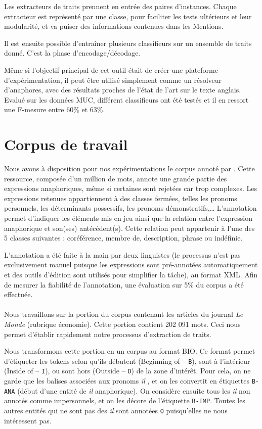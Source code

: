 \documentclass[a4paper,12pt]{article}
\begin{document}
Les extracteurs de traits prennent en entrée des paires d'instances. Chaque extracteur est représenté par une classe, pour faciliter les tests ultérieurs et leur modularité, et va puiser des informations contenues dans les Mentions.

Il est ensuite possible d'entraîner plusieurs classifieurs sur un ensemble de traits donné. C'est la phase d'encodage/décodage.

Même si l'objectif principal de cet outil était de créer une plateforme d'expérimentation, il peut être utilisé simplement comme un résolveur d'anaphores, avec des résultats proches de l'état de l'art sur le texte anglais. Evalué sur les données MUC, différent classifieurs ont été testés et il en ressort une F-mesure entre 60\% et 63\%.

\section{Corpus de travail}
\label{corpus}

Nous avons à disposition pour nos expérimentations le corpus annoté par \citet{tutin-hal-00373327}.
Cette ressource, composée d'un million de mots, annote une grande partie des expressions anaphoriques, même si certaines sont rejetées car trop complexes. Les expressions retenues appartiennent à des classes fermées, telles les pronoms personnels, les déterminants possessifs, les pronoms démonstratifs,\ldots
L'annotation permet d'indiquer les éléments mis en jeu ainsi que la relation entre l'expression anaphorique et son(ses) antécédent(s). Cette relation peut appartenir à l'une des 5 classes suivantes : coréférence, membre de, description, phrase ou indéfinie.

L'annotation a été faite à la main par deux linguistes (le processus n'est pas exclusivement manuel puisque les expressions sont pré-annotées automatiquement et des outils d'édition sont utilisés pour simplifier la tâche), au format XML. Afin de mesurer la fiabilité de l'annotation, une évaluation sur 5\% du corpus a été effectuée.

\paragraph{}
Nous travaillons sur la portion du corpus contenant les articles du journal \emph{Le Monde} (rubrique économie). Cette portion contient 202 091 mots. Ceci nous permet d'établir rapidement notre processus d'extraction de traits.


Nous transformons cette portion en un corpus au format BIO. Ce format permet d'étiqueter les tokens selon qu'ils débutent (Beginning of -- \verb!B!), sont à l'intérieur (Inside of -- \verb!I!), ou sont hors (Outside -- \verb!O!) de la zone d'intérêt.
Pour cela, on ne garde que les balises associées aux pronoms \og \textit{il} \fg{}, et on les convertit en étiquettes \verb!B-ANA! (début d'une entité de \og \textit{il} \fg{} anaphorique). On considère ensuite tous les \og \textit{il} \fg{} non annotés comme impersonnels, et on les décore de l'étiquette \verb!B-IMP!. Toutes les autres entités qui ne sont pas des \og \textit{il} \fg{} sont annotées \verb!O! puisqu'elles ne nous intéressent pas.
\label{annotation-imp}
\end{document}
